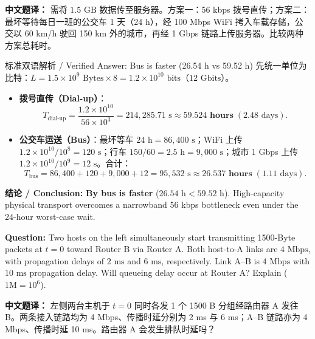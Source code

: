 \textbf{中文题译：} 需将 $1.5\text{ GB}$ 数据传至服务器。方案一：56 kbps 拨号直传；方案二：最坏等待每日一班的公交车 1 天（24 h），经 100 Mbps WiFi 拷入车载存储，公交以 60 km/h 驶回 150 km 外的城市，再经 1 Gbps 链路上传服务器。比较两种方案总耗时。

\begin{StudySolution}{标准双语解析 / Verified Answer: Bus is faster (26.54 h vs 59.52 h)}
先统一单位为比特：$L = 1.5 \times 10^9 \text{ Bytes} \times 8 = 1.2 \times 10^{10}\text{ bits}$（$12\text{ Gbits}$）。
\begin{itemize}
\item \textbf{拨号直传（Dial-up）}：
  \[
  T_{\text{dial-up}} = \frac{1.2 \times 10^{10}}{56 \times 10^3} = 214{,}285.71\text{ s} \approx \mathbf{59.524\text{ hours}} \;(2.48\text{ days}). \tag{F.1}
  \]
\item \textbf{公交车运送（Bus）}：最坏等车 $24\text{ h} = 86{,}400\text{ s}$；WiFi 上传 $1.2\times 10^{10}/10^8 = 120\text{ s}$；行车 $150/60 = 2.5\text{ h} = 9{,}000\text{ s}$；城市 1 Gbps 上传 $1.2\times 10^{10}/10^9 = 12\text{ s}$。合计：
  \[
  T_{\text{bus}} = 86{,}400 + 120 + 9{,}000 + 12 = 95{,}532\text{ s} \approx \mathbf{26.537\text{ hours}} \;(1.11\text{ days}). \tag{F.2}
  \]
\end{itemize}
\textbf{结论 / Conclusion:} \textbf{By bus is faster} ($26.54\text{ h} < 59.52\text{ h}$). High-capacity physical transport overcomes a narrowband 56 kbps bottleneck even under the 24-hour worst-case wait.
\end{StudySolution}


\textbf{Question:} Two hosts on the left simultaneously start transmitting 1500-Byte packets at $t=0$ toward Router B via Router A. Both host-to-A links are $4\text{ Mbps}$, with propagation delays of $2\text{ ms}$ and $6\text{ ms}$, respectively. Link A--B is $4\text{ Mbps}$ with $10\text{ ms}$ propagation delay. Will queueing delay occur at Router A? Explain ($1\text{M}=10^6$).

\textbf{中文题译：} 左侧两台主机于 $t=0$ 同时各发 1 个 1500 B 分组经路由器 A 发往 B。两条接入链路均为 4 Mbps、传播时延分别为 2 ms 与 6 ms；A–B 链路亦为 4 Mbps、传播时延 10 ms。路由器 A 会发生排队时延吗？


